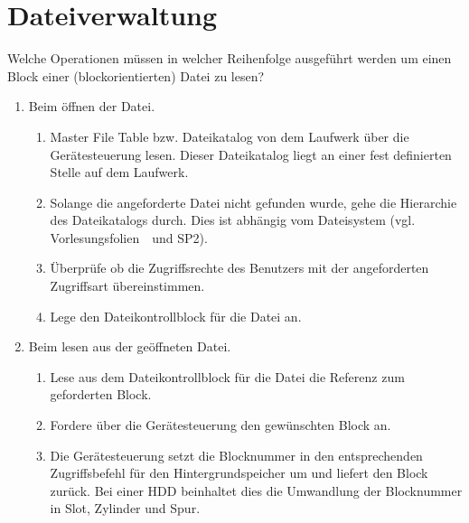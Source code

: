 \section{Dateiverwaltung}
Welche Operationen müssen in welcher Reihenfolge ausgeführt werden um einen Block einer (blockorientierten) Datei zu lesen?

\begin{enumerate}
\item Beim öffnen der Datei.
\begin{solution}
\begin{enumerate}
	\item Master File Table bzw. Dateikatalog von dem Laufwerk über die Gerätesteuerung lesen.
	Dieser Dateikatalog liegt an einer fest definierten Stelle auf dem Laufwerk.
	\item Solange die angeforderte Datei nicht gefunden wurde, gehe die Hierarchie des Dateikatalogs durch.
	Dies ist abhängig vom Dateisystem (vgl. Vorlesungsfolien~\Katalogeintraege~und SP2).
	\item Überprüfe ob die Zugriffsrechte des Benutzers mit der angeforderten Zugriffsart übereinstimmen.
	\item Lege den Dateikontrollblock für die Datei an.
\end{enumerate}
\end{solution}
\item Beim lesen aus der geöffneten Datei.
\begin{solution}
\begin{enumerate}
	\item Lese aus dem Dateikontrollblock für die Datei die Referenz zum geforderten Block.
	\item Fordere über die Gerätesteuerung den gewünschten Block an.
	\item Die Gerätesteuerung setzt die Blocknummer in den entsprechenden Zugriffsbefehl für den Hintergrundspeicher um und liefert den Block zurück.
	Bei einer HDD beinhaltet dies die Umwandlung der Blocknummer in Slot, Zylinder und Spur.
\end{enumerate}
\end{solution}
\end{enumerate}
